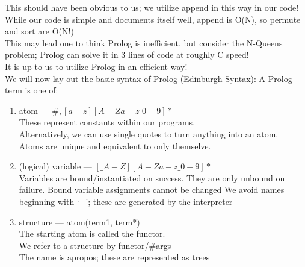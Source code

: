 \documentclass[../../lecture_notes.tex]{subfiles}
\begin{document}
\noindent This should have been obvious to us; we utilize append in this way in our code!\\
While our code is simple and documents itself well, append is O(N), so permute and sort are O(N!)\\
This may lead one to think Prolog is inefficient, but consider the N-Queens problem;
\indent Prolog can solve it in 3 lines of code at roughly C speed!\\
It is up to us to utilize Prolog in an efficient way!
\\
We will now lay out the basic syntax of Prolog (Edinburgh Syntax):
A Prolog term is one of:
\begin{enumerate} [itemsep=0mm]
	\item atom — ${\#, [a-z][A-Za-z\_0-9]*}$\\
		These represent constants within our programs.\\
		Alternatively, we can use single quotes to turn anything into an atom.\\
		Atoms are unique and equivalent to only themselve.\\
	\item (logical) variable — $[\_A-Z][A-Za-z\_0-9]*$\\
		Variables are bound/instantiated on success.
		They are only unbound on failure.
		Bound variable assignments cannot be changed
		We avoid names beginning with ‘\_’; these are generated by the interpreter
	\item structure — {atom(term1{, term}*)}\\
		The starting atom is called the functor.\\
		We refer to a structure by functor/\#args\\
		The name is apropos; these are represented as trees
\end{enumerate}
\begin{center}  \end{center} \medskip
\end{document}
